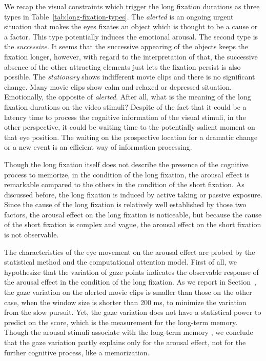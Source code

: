 \documentclass[oneside,master]{snueethesis}
\begin{document}
We recap the visual constraints which trigger the long fixation durations as three types in Table~\ref{tab:long-fixation-types}. The \textit{alerted} is an ongoing urgent situation that makes the eyes fixates an object which is thought to be a cause or a factor. This type potentially induces the emotional arousal. The second type is the \textit{successive}. It seems that the successive appearing of the objects keeps the fixation longer, however, with regard to the interpretation of that, the successive absence of the other attracting elements just lets the fixation persist is also possible. The \textit{stationary} shows indifferent movie clips and there is no significant change. Many movie clips show calm and relaxed or depressed situation. Emotionally, the opposite of \textit{alerted}. After all, what is the meaning of the long fixation durations on the video stimuli? Despite of the fact that it could be a latency time to process the cognitive information of the visual stimuli, in the other perspective, it could be waiting time to the potentially salient moment on that eye position. The waiting on the prospective location for a dramatic change or a new event is an efficient way of information processing.

Though the long fixation itself does not describe the presence of the cognitive process to memorize, in the condition of the long fixation, the arousal effect is remarkable compared to the others in the condition of the short fixation. As discussed before, the long fixation is induced by active taking or passive exposure. Since the cause of the long fixation is relatively well established by those two factors, the arousal effect on the long fixation is noticeable, but because the cause of the short fixation is complex and vague, the arousal effect on the short fixation is not observable.

The characteristics of the eye movement on the arousal effect are probed by the statistical method and the computational attention model. First of all, we hypothesize that the variation of gaze points indicates the observable response of the arousal effect in the condition of the long fixation. As we report in Section~, the gaze variation on the alerted movie clips is smaller than those on the other case, when the window size is shorter than 200 ms, to minimize the variation from the slow pursuit. Yet, the gaze variation does not have a statistical power to predict on the score, which is the measurement for the long-term memory. Though the arousal stimuli associate with the long-term memory \cite{Cahill1996amyg,Cahill1998baso}, we conclude that the gaze variation partly explains only for the arousal effect, not for the further cognitive process, like a memorization.
\end{document}
